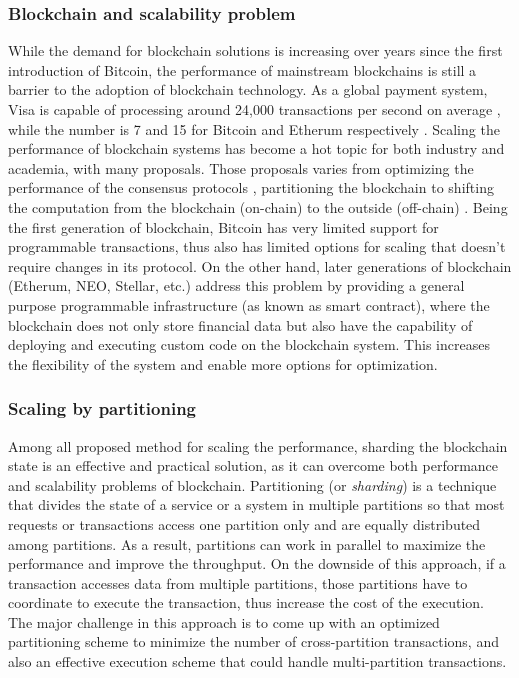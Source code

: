 \subsubsection{Blockchain and scalability problem}
While the demand for blockchain solutions is increasing over years since the
first introduction of Bitcoin, the performance of mainstream blockchains is
still a barrier to the adoption of blockchain technology. As a global payment
system, Visa is capable of processing around 24,000 transactions per second on
average \cite{visa}, while the number is 7 and 15 for Bitcoin and Etherum
respectively \cite{ethereum:sharding, nakamoto2019bitcoin}. Scaling the
performance of blockchain systems has become a hot topic for both industry and
academia, with many proposals. Those proposals varies from optimizing the
performance of the consensus protocols \cite{dang2019towards}, partitioning the
blockchain \cite{wang2019sok} to shifting the computation from the blockchain
(on-chain) to the outside (off-chain) \cite{teutsch2019scalable,
network2018cheap}. Being the first generation of blockchain, Bitcoin has very
limited support for programmable transactions, thus also has limited options for
scaling that doesn't require changes in its protocol. On the other hand, later
generations of blockchain (Etherum, NEO, Stellar, etc.) address this problem by
providing a general purpose programmable infrastructure (as known as smart
contract), where the blockchain does not only store financial data but also have
the capability of deploying and executing custom code on the blockchain system.
This increases the flexibility of the system and enable more options for
optimization.

\subsubsection{Scaling by partitioning}
Among all proposed method for scaling the performance, sharding the blockchain
state is an effective and practical solution, as it can overcome both
performance and scalability problems of blockchain. Partitioning (or
\emph{sharding}) is a technique that divides the state of a service or a system
in multiple partitions so that most requests or transactions access one
partition only and are equally distributed among partitions. As a result,
partitions can work in parallel to maximize the performance and improve the
throughput. On the downside of this approach, if a transaction accesses data
from multiple partitions, those partitions have to coordinate to execute the
transaction, thus increase the cost of the execution. The major challenge in
this approach is to come up with an optimized partitioning scheme to minimize
the number of cross-partition transactions, and also an effective execution
scheme that could handle multi-partition transactions.

